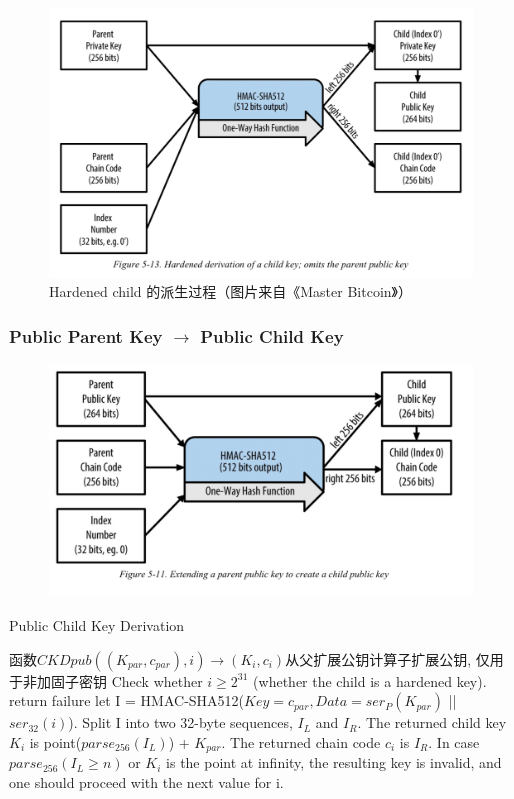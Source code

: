 \begin{figure}[h]
\centering
\includegraphics[width=.7\textwidth]{./CKDpriv2.png}
\caption{Hardened child 的派生过程（图片来自《Master Bitcoin》）}\label{fig-parsesig}
\end{figure}



\subsubsection{Public Parent Key $\rightarrow$ Public Child Key}

\begin{figure}[h]
\centering
\includegraphics[width=.7\textwidth]{./CKDpub.png}
\caption{}\label{fig-parsesig}
\end{figure}

\begin{algorithm}[tbp]\footnotesize
\caption{Public Child Key Derivation}
  	\begin{algorithmic}[1]
	    \STATE 函数$CKDpub((K_{par}, c_{par}), i) \rightarrow (K_i, c_i)$从父扩展公钥计算子扩展公钥, 仅用于非加固子密钥
		\STATE Check whether $i \geq 2^{31}$ (whether the child is a hardened key).
			\STATE return failure  
		\ELSE
			\STATE let I = HMAC-SHA512($Key = c_{par}, Data = ser_P(K_{par})$ || $ser_{32}(i)$). 
		\ENDIF
		\STATE Split I into two 32-byte sequences, $I_L$ and $I_R$.
		\STATE The returned child key $K_i$ is point($parse_{256}(I_L)$) + $K_{par}$.  
		\STATE The returned chain code $c_i$ is $I_R$.  
		\STATE In case $parse_{256}(I_L\geq n)$  or $K_i$ is the
		 point at infinity, the resulting key is invalid, and one should proceed with 
		 the next value for i. 
    \end{algorithmic}
\end{algorithm}

